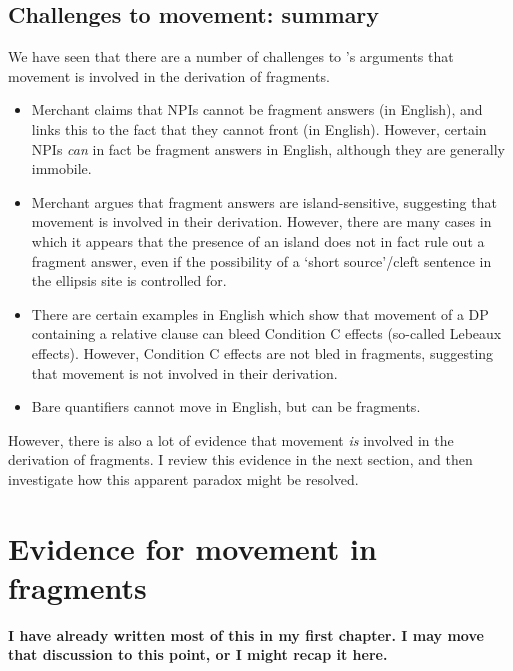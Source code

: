 \documentclass[11pt,letterpaper]{article}
\begin{document}
\subsection{Challenges to movement: summary}

We have seen that there are a number of challenges to \cite{Me04}'s arguments that movement is involved in the derivation of fragments.

\begin{itemize}
\item Merchant claims that NPIs cannot be fragment answers (in English), and links this to the fact that they cannot front (in English). However, certain NPIs \emph{can} in fact be fragment answers in English, although they are generally immobile.
\item Merchant argues that fragment answers are island-sensitive, suggesting that movement is involved in their derivation. However, there are many cases in which it appears that the presence of an island does not in fact rule out a fragment answer, even if the possibility of a `short source'/cleft sentence in the ellipsis site is controlled for.
\item There are certain examples in English which show that movement of a DP containing a relative clause can bleed Condition C effects (so-called Lebeaux effects). However, Condition C effects are not bled in fragments, suggesting that movement is not involved in their derivation.
\item Bare quantifiers cannot move in English, but can be fragments.
\end{itemize}

However, there is also a lot of evidence that movement \emph{is} involved in  the derivation of fragments. I review this evidence in the next section, and then investigate how this apparent paradox might be resolved.

\section{Evidence for movement in fragments}

\textbf{I have already written most of this in my first chapter. I may move that discussion to this point, or I might recap it here.}

\end{document}
